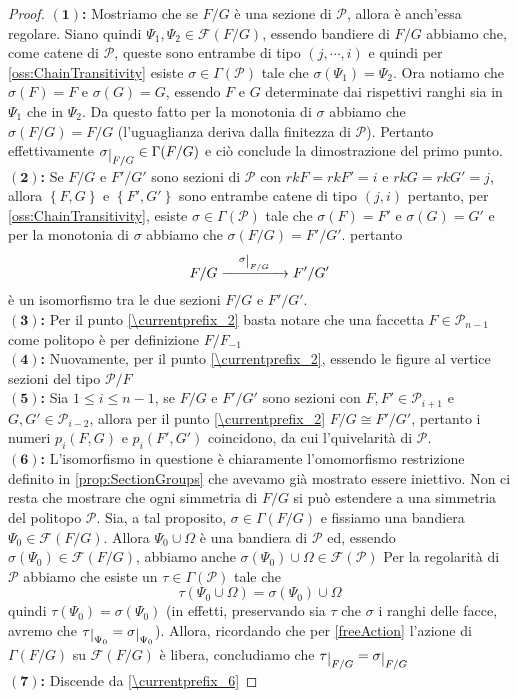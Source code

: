 \documentclass[a4paper,12pt]{report}
\newcommand{\p}{\mathcal{P}}
\theoremstyle{plain}
\theoremstyle{definition}
\newcommand\localref[1]{\ref{\currentprefix_#1}}
\newcommand\point[1]{$\bm{(#1)}$\textbf{: }}
\newcommand\flag[1]{\mathcal{F}(#1)}
\def\restrict#1{\raise-.5ex\hbox{\ensuremath|}_{#1}}
\begin{document}
\begin{proof}
\point{1}Mostriamo che se $F/G$ \`e una sezione di $\p$, allora \`e anch'essa regolare. Siano quindi $\Psi_1,\Psi_2\in\mathcal{F}(F/G)$, essendo
bandiere di $F/G$ abbiamo che, come catene di $\p$, queste sono entrambe di tipo $(j,\cdots,i)$ e quindi per \ref{oss:ChainTransitivity} esiste
$\sigma\in\Gamma(\p)$ tale che $\sigma(\Psi_1)=\Psi_2$. Ora notiamo che $\sigma(F)=F$ e $\sigma(G)=G$, essendo $F$ e $G$ determinate
dai rispettivi ranghi sia in $\Psi_1$ che in $\Psi_2$. Da questo fatto per la monotonia di $\sigma$ abbiamo che $\sigma(F/G)=F/G$
(l'uguaglianza deriva dalla finitezza di $\p$). Pertanto effettivamente $\sigma\restrict{F/G}\in\Gamma(F/G)$
e ci\`o conclude la dimostrazione del primo punto.\\
\point{2}Se $F/G$ e $F'/G'$ sono sezioni di $\p$ con $rkF=rkF'=i$ e $rkG=rkG'=j$, allora $\left\{F,G\right\}$ e $\left\{F',G'\right\}$ sono entrambe
catene di tipo $(j,i)$ pertanto, per \ref{oss:ChainTransitivity}, esiste $\sigma\in\Gamma(\p)$ tale che $\sigma(F)=F'$ e 
$\sigma(G)=G'$ e per la monotonia di $\sigma$ abbiamo che $\sigma(F/G)=F'/G'$. pertanto
\begin{equation*}
F/G\xrightarrow{\quad\sigma\restrict{F/G}\quad}F'/G'
\end{equation*}
\`e un isomorfismo tra le due sezioni $F/G$ e $F'/G'$.\\
\point{3}Per il punto \localref{2} basta notare che una faccetta $F\in\p_{n-1}$ come politopo \`e per definizione $F/F_{-1}$\\
\point{4}Nuovamente, per il punto \localref{2}, essendo le figure al vertice sezioni del tipo $\p/F$\\
\point{5}Sia $1\leq i\leq n-1$, se $F/G$ e $F'/G'$ sono sezioni con $F,F'\in\p_{i+1}$ e $G,G'\in\p_{i-2}$, allora
per il punto \localref{2} $F/G\cong F'/G'$, pertanto i numeri $p_i(F,G)$ e $p_i(F',G')$ coincidono, da cui l'quivelarit\`a di $\p$.\\
\point{6}L'isomorfismo in questione \`e chiaramente l'omomorfismo restrizione definito in \ref{prop:SectionGroups} che avevamo gi\`a mostrato
essere iniettivo. Non ci resta che mostrare che ogni simmetria di $F/G$ si pu\`o estendere a una simmetria del politopo $\p$. Sia, a tal proposito,
$\sigma\in\Gamma(F/G)$ e fissiamo una bandiera $\Psi_0\in\mathcal{F}(F/G)$. Allora $\Psi_0\cup\Omega$ \`e una bandiera di $\p$ ed, 
essendo $\sigma(\Psi_0)\in\mathcal{F}(F/G)$, abbiamo anche $\sigma(\Psi_0)\cup\Omega\in\flag{\p}$
Per la regolarit\`a di $\p$ abbiamo che esiste un $\tau\in\Gamma(\p)$ tale che
\begin{equation*}
\tau(\Psi_0\cup\Omega)=\sigma(\Psi_0)\cup\Omega
\end{equation*}
quindi $\tau(\Psi_0)=\sigma(\Psi_0)$ (in effetti, preservando sia $\tau$ che $\sigma$ i ranghi delle facce, avremo che
 $\tau\restrict{\Psi_0}=\sigma\restrict{\Psi_0}$).
Allora, ricordando che per \ref{freeAction} l'azione di $\Gamma(F/G)$ su $\flag{F/G}$ \`e libera, concludiamo che
 $\tau\restrict{F/G}=\sigma\restrict{F/G}$\\
 \point{7}Discende da \localref{6}
\end{proof}
\end{document}
